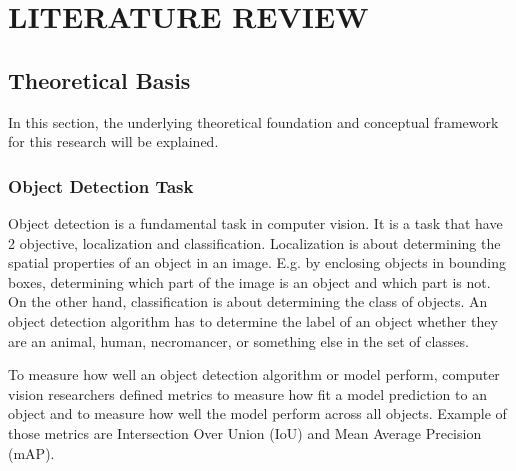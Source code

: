 \chapter{LITERATURE REVIEW}
\section{Theoretical Basis}
In this section, the underlying theoretical foundation and conceptual framework for this research will be explained.
  \subsection{Object Detection Task}
  Object detection is a fundamental task in computer vision.
  It is a task that have 2 objective, localization and classification.
  Localization is about determining the spatial properties of an object in an image. E.g. by
  enclosing objects in bounding boxes, determining which part of the image is an object and which part is not. 
  On the other hand, classification is about determining the class of
  objects. An object detection algorithm has to determine the label of an object whether
  they are an animal, human, necromancer, or something else in the set of classes.

  To measure how well an object detection algorithm or model perform, computer vision
  researchers defined metrics to measure how fit a model prediction to an object
  and to measure how well the model perform across all objects. Example of those metrics are Intersection Over Union (IoU) and Mean Average Precision (mAP).
  



